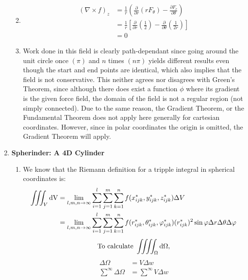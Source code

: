 \documentclass[12pt]{article}
\begin{document}
\begin{enumerate}
\begin{enumerate}
        \newpage
        \item 
        \vspace{-5pt}
        \begin{align*}
            (\nabla\times f)_z&=\frac{1}{r}\left(\frac{\partial}{\partial r}(rF_\theta)-\frac{\partial F_r}{\partial\theta}\right)\\
            &=\frac{1}{r}\left[\frac{\partial}{\partial r}\left(\frac{1}{2}\right)- \frac{\partial}{\partial\theta}\left(\frac{1}{2r}\right)\right]\\
            &=\boxed{0}
        \end{align*}
        \item Work done in this field is clearly path-dependant since going around the unit circle once $(\pi)$ and $n$ times $(n\pi)$ yields different results even though the start and end points are identical, which also implies that the field is not conservative. This neither agrees nor disagrees with Green's Theorem, since although there does exist a function $\phi$ where its gradient is the given force field, the domain of the field is not a regular region (not simply connected). Due to the same reason, the Gradient Theorem, or the Fundamental Theorem does not apply here generally for cartesian coordinates. However, since in polar coordinates the origin is omitted, the Gradient Theorem will apply.
    \end{enumerate}
    \newpage
    \item \textbf{Spherinder: A 4D Cylinder}
    \begin{enumerate}
        \item We know that the Riemann definition for a tripple integral in spherical coordinates is:
        \begin{align*}
            \iiint_V {\rm dV}&=\lim_{l,m,n\rightarrow\infty}\sum_{i=1}^l\sum_{j=1}^m\sum_{k=1}^nf(x^*_{ijk},y^*_{ijk},z^*_{ijk})\Delta V\\
            &=\lim_{l,m,n\rightarrow\infty}\sum_{i=1}^l\sum_{j=1}^m\sum_{k=1}^nf(r^*_{ijk},\theta^*_{ijk},\varphi^*_{ijk})(r^*_{ijk})^2\sin\varphi\Delta r\Delta\theta\Delta\varphi
        \end{align*}
        \begin{equation*}
            \text{To calculate }\iiiint_\Omega{\rm d}\Omega,
        \end{equation*}
        \begin{align*}
            \Delta\Omega&=V\Delta w\\
            \sum^\infty\Delta\Omega&=\sum^\infty V\Delta w\\

\end{align*}
\end{enumerate}
\end{enumerate}
\end{document}
